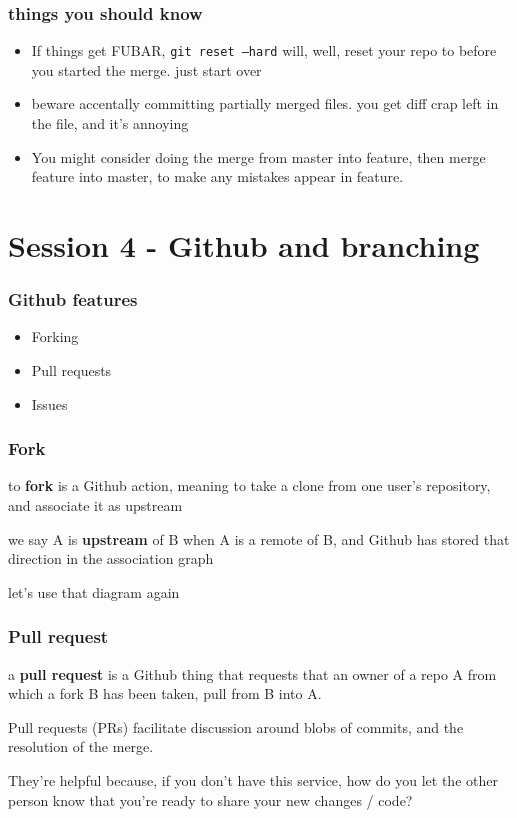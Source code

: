 \documentclass[14pt,aspectratio=1610]{beamer} %
\newcommand{\fframe}[2]{
   \begin{frame}
\frametitle{#1}
#2
\end{frame}
}
\begin{document}
\fframe{things you should know}
{
\begin{itemize}
		\item If things get FUBAR, {\tt git reset --hard} will, well, reset your repo to before you started the merge.  just start over
		\item beware accentally committing partially merged files.  you get diff crap left in the file, and it's annoying
		\item You might consider doing the merge from master into feature, then merge feature into master, to make any mistakes appear in feature.
	\end{itemize}
}










\section{Session 4 - Github and branching}

\fframe{Github features}
{
\begin{itemize}
	\item Forking
	\item Pull requests
	\item Issues
\end{itemize}
}


\fframe{Fork}
{
	\begin{definition}
to {\bf fork} is a Github action, meaning to take a clone from one user's repository, and associate it as upstream
	\end{definition}

	\begin{definition}
we say A is {\bf upstream} of B when A is a remote of B, and Github has stored that direction in the association graph
	\end{definition}

	let's use that diagram again
}


\fframe{Pull request}
{
	\begin{definition}
		a {\bf pull request} is a Github thing that requests that an owner of a repo A from which a fork B has been taken, pull from B into A.
	\end{definition}

	Pull requests (PRs) facilitate discussion around blobs of commits, and the resolution of the merge.

	They're helpful because, if you don't have this service, how do you let the other person know that you're ready to share your new changes / code?
}
\end{document}
